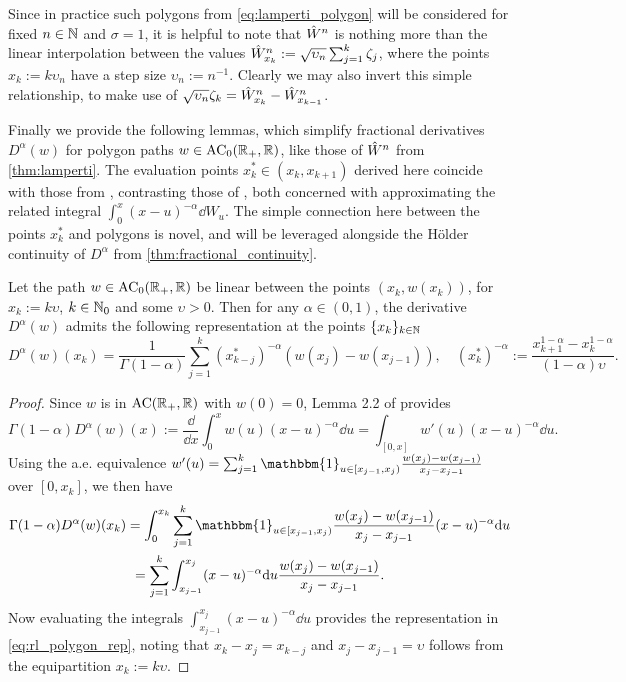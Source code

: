 Since in practice such polygons from \autoref{eq:lamperti_polygon}  will be considered  for fixed $n\in\mathbb{N}$ and $\sigma=1$, it is helpful to note that ${\hat{W}}^n$ is nothing more than the linear interpolation between the values ${\hat{W}}^n_{x_k}:=\sqrt{\upsilon_n}\sum_{j=1}^k\zeta_j$, where the points $x_k:=k\upsilon_n$ have a step size $\upsilon_n:=n^{-1}$. Clearly we may also invert this simple relationship, to make use of  $\sqrt{\upsilon_n}\zeta_k = {\hat{W}}^n_{x_k} - {\hat{W}}^n_{x_{k-1}}$.

Finally we provide the following lemmas, which simplify fractional derivatives $D^\alpha(w)$ for polygon paths $w\in\mathrm{AC}_0(\mathbb{R}_+,\mathbb{R})$, like those of ${\hat{W}}^n$ from \autoref{thm:lamperti}. The evaluation points $x^*_k\in(x_k,x_{k+1})$ derived here coincide with those from \cite{bennedsen_2017}, contrasting those of \cite{horvath_2024}, both concerned with approximating the related integral $\int_0^x(x-u)^{-\alpha}\dd W_u$. The simple connection here between the points $x^*_k$ and polygons is novel, and will be leveraged alongside the H\"older continuity of $D^\alpha$ from \autoref{thm:fractional_continuity}.

\begin{lemma}\label{lem:RL_polygons}
    Let the path $w\in\mathrm{AC}_0(\mathbb{R}_+,\mathbb{R})$ be linear between the points $(x_k,w(x_k))$, for $x_k:=k\upsilon$, $k\in\mathbb{N}_0$ and some $\upsilon>0$. Then for any $\alpha\in(0,1)$, the derivative $D^\alpha(w)$ admits the following representation at the points $\{x_k\}_{k\in\mathbb{N}}$
    \begin{equation}\label{eq:rl_polygon_rep}
        D^\alpha(w)(x_k) = \frac{1}{\Gamma(1-\alpha)}\sum_{j=1}^k (x^*_{k-j})^{-\alpha} (w(x_j)-w(x_{j-1})),\quad (x^*_k)^{-\alpha} := \frac{x_{k+1}^{1-\alpha} - x_k^{1-\alpha}}{(1-\alpha)\upsilon}.
    \end{equation}
\end{lemma}
\begin{proof}
    Since $w$ is in $\mathrm{AC}(\mathbb{R}_+,\mathbb{R})$ with $w(0)=0$, Lemma 2.2 of \cite{samko_1993} provides
    \begin{equation}
        \Gamma(1-\alpha)D^\alpha(w)(x):=\frac{\dd}{\dd x}\int_0^x w(u)(x-u)^{-\alpha}\dd u = \int_{[0,x]}w'(u)(x-u)^{-\alpha}\dd u.
    \end{equation}
    Using the a.e. equivalence $w'(u) = \sum_{j=1}^k \mathbbm{1}_{u\in[x_{j-1},x_j)}\frac{w(x_j) - w(x_{j-1})}{x_j - x_{j-1}}$ over $[0,x_k]$, we then have
    \begin{multline}\label{eq:rl_polygon}
        \Gamma(1-\alpha)D^\alpha(w)(x_k) = \int_0^{x_k}\sum_{j=1}^k \mathbbm{1}_{u\in[x_{j-1},x_j)}\frac{w(x_j) - w(x_{j-1})}{x_j - x_{j-1}}(x-u)^{-\alpha}\dd u \\
        = \sum_{j=1}^k \int_{x_{j-1}}^{x_j}(x-u)^{-\alpha}\dd u \frac{w(x_j) - w(x_{j-1})}{x_j - x_{j-1}}.
    \end{multline}
    Now evaluating the integrals $\int_{x_{j-1}}^{x_j}(x-u)^{-\alpha}\dd u$ provides the representation in \autoref{eq:rl_polygon_rep}, noting that $x_k - x_j = x_{k-j}$ and $x_j - x_{j-1}=\upsilon$ follows from the equipartition $x_k:=k\upsilon$.
\end{proof}

